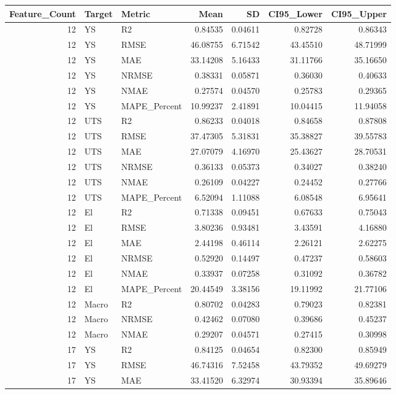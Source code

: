 \begin{tabular}{rllrrrr}
\toprule
Feature_Count & Target & Metric & Mean & SD & CI95_Lower & CI95_Upper \\
\midrule
12 & YS & R2 & 0.84535 & 0.04611 & 0.82728 & 0.86343 \\
12 & YS & RMSE & 46.08755 & 6.71542 & 43.45510 & 48.71999 \\
12 & YS & MAE & 33.14208 & 5.16433 & 31.11766 & 35.16650 \\
12 & YS & NRMSE & 0.38331 & 0.05871 & 0.36030 & 0.40633 \\
12 & YS & NMAE & 0.27574 & 0.04570 & 0.25783 & 0.29365 \\
12 & YS & MAPE_Percent & 10.99237 & 2.41891 & 10.04415 & 11.94058 \\
12 & UTS & R2 & 0.86233 & 0.04018 & 0.84658 & 0.87808 \\
12 & UTS & RMSE & 37.47305 & 5.31831 & 35.38827 & 39.55783 \\
12 & UTS & MAE & 27.07079 & 4.16970 & 25.43627 & 28.70531 \\
12 & UTS & NRMSE & 0.36133 & 0.05373 & 0.34027 & 0.38240 \\
12 & UTS & NMAE & 0.26109 & 0.04227 & 0.24452 & 0.27766 \\
12 & UTS & MAPE_Percent & 6.52094 & 1.11088 & 6.08548 & 6.95641 \\
12 & El & R2 & 0.71338 & 0.09451 & 0.67633 & 0.75043 \\
12 & El & RMSE & 3.80236 & 0.93481 & 3.43591 & 4.16880 \\
12 & El & MAE & 2.44198 & 0.46114 & 2.26121 & 2.62275 \\
12 & El & NRMSE & 0.52920 & 0.14497 & 0.47237 & 0.58603 \\
12 & El & NMAE & 0.33937 & 0.07258 & 0.31092 & 0.36782 \\
12 & El & MAPE_Percent & 20.44549 & 3.38156 & 19.11992 & 21.77106 \\
12 & Macro & R2 & 0.80702 & 0.04283 & 0.79023 & 0.82381 \\
12 & Macro & NRMSE & 0.42462 & 0.07080 & 0.39686 & 0.45237 \\
12 & Macro & NMAE & 0.29207 & 0.04571 & 0.27415 & 0.30998 \\
17 & YS & R2 & 0.84125 & 0.04654 & 0.82300 & 0.85949 \\
17 & YS & RMSE & 46.74316 & 7.52458 & 43.79352 & 49.69279 \\
17 & YS & MAE & 33.41520 & 6.32974 & 30.93394 & 35.89646 \\

\end{tabular}
